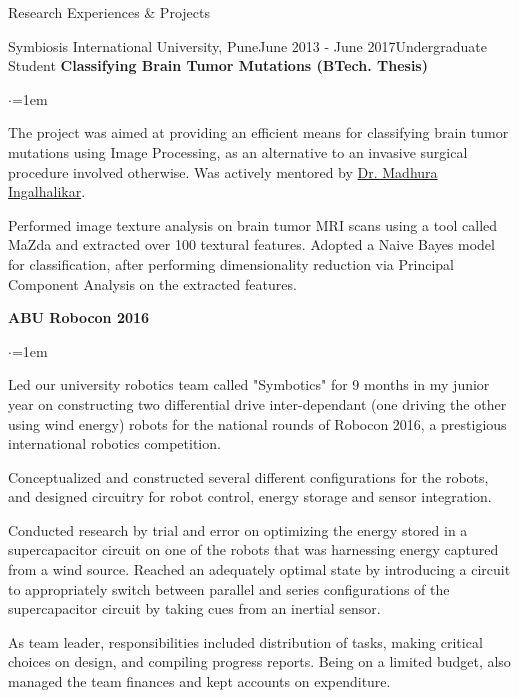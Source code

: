 \documentclass{resume} %
\begin{document}
\begin{rSection}{Research Experiences \& Projects}
\begin{rSubsection}{Symbiosis International University, Pune}{June 2013 - June 2017}{Undergraduate Student}{}
{\textbullet \hspace{0.1em} \textbf{Classifying Brain Tumor Mutations (BTech. Thesis)}}

\vspace*{-0.2em}
\begin{list}{$\cdot$}{\leftmargin=1em} %
\item The project was aimed at providing an efficient means for classifying brain tumor mutations using Image Processing, as an alternative to an invasive surgical procedure involved otherwise. Was actively mentored by \href{https://scholar.google.com/citations?hl=en&user=UdKti2kAAAAJ&view_op=list_works&sortby=pubdate}{Dr. Madhura Ingalhalikar}.
\item Performed image texture analysis on brain tumor MRI scans using a tool called MaZda and extracted over 100 textural features. Adopted a Naive Bayes model for classification, after performing dimensionality reduction via Principal Component Analysis on the extracted features.
\end{list}

{\textbullet \hspace{0.1em} \textbf{ABU Robocon 2016}}

\vspace*{-0.2em}
\begin{list}{$\cdot$}{\leftmargin=1em} %
\item Led our university robotics team called "Symbotics" for 9 months in my junior year on constructing two differential drive inter-dependant (one driving the other using wind energy) robots for the national rounds of Robocon 2016, a prestigious international robotics competition.
\item Conceptualized and constructed several different configurations for the robots, and designed circuitry for robot control, energy storage and sensor integration. 
\item Conducted research by trial and error on optimizing the energy stored in a supercapacitor circuit on one of the robots that was harnessing energy captured from a wind source. Reached an adequately optimal state by introducing a circuit to appropriately switch between parallel and series configurations of the supercapacitor circuit by taking cues from an inertial sensor.
\item As team leader, responsibilities included distribution of tasks, making critical choices on design, and compiling progress reports. Being on a limited budget, also managed the team finances and kept accounts on expenditure.
\end{list}


\end{rSubsection}
\end{rSection}
\end{document}
